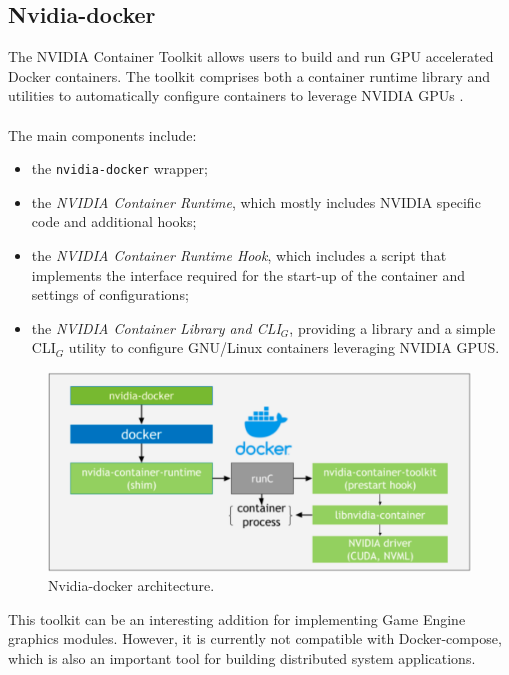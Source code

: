 \subsection{Nvidia-docker}
The NVIDIA Container Toolkit allows users to build and run GPU accelerated Docker containers. The toolkit comprises both a container runtime library and utilities to automatically configure containers to leverage NVIDIA GPUs \cite{site:nvidia-docker-doc}. \\ \\
The main components \cite{site:nvidia-docker-repo} include:
\begin{itemize}
	\item the \texttt{nvidia-docker} wrapper;
	\item the \textit{NVIDIA Container Runtime}, which mostly includes NVIDIA specific code and additional hooks;
	\item the\textit{ NVIDIA Container Runtime Hook}, which includes a script that implements the interface required for the start-up of the container and settings of configurations;
	\item the \textit{NVIDIA Container Library and CLI$_G$}, providing a library and a simple CLI$_G$ utility to configure GNU/Linux containers leveraging NVIDIA GPUS.
\end{itemize}
\begin{figure}[h!]
	\centering
	\includegraphics[width=0.9\linewidth]{immagini/Technologies/nvidia-docker-arch-new}
	\caption[Nvidia-docker architecture.]{Nvidia-docker architecture.}
	\label{fig:nvidia-docker-arch-new}
\end{figure}
This toolkit can be an interesting addition for implementing Game Engine graphics modules. However, it is currently not compatible with Docker-compose, which is also an important tool for building distributed system applications.


